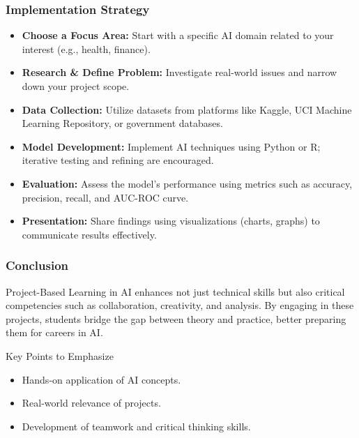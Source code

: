 \documentclass{beamer}
\begin{document}
\begin{frame}[fragile]
    \frametitle{Implementation Strategy}
    \begin{itemize}
        \item \textbf{Choose a Focus Area:} Start with a specific AI domain related to your interest (e.g., health, finance).
        \item \textbf{Research \& Define Problem:} Investigate real-world issues and narrow down your project scope.
        \item \textbf{Data Collection:} Utilize datasets from platforms like Kaggle, UCI Machine Learning Repository, or government databases.
        \item \textbf{Model Development:} Implement AI techniques using Python or R; iterative testing and refining are encouraged.
        \item \textbf{Evaluation:} Assess the model's performance using metrics such as accuracy, precision, recall, and AUC-ROC curve.
        \item \textbf{Presentation:} Share findings using visualizations (charts, graphs) to communicate results effectively.
    \end{itemize}
\end{frame}

\begin{frame}[fragile]
    \frametitle{Conclusion}
    Project-Based Learning in AI enhances not just technical skills but also critical competencies such as collaboration, creativity, and analysis. By engaging in these projects, students bridge the gap between theory and practice, better preparing them for careers in AI.
    
    \begin{block}{Key Points to Emphasize}
        \begin{itemize}
            \item Hands-on application of AI concepts.
            \item Real-world relevance of projects.
            \item Development of teamwork and critical thinking skills.
        \end{itemize}
    \end{block}
\end{frame}
\end{document}
